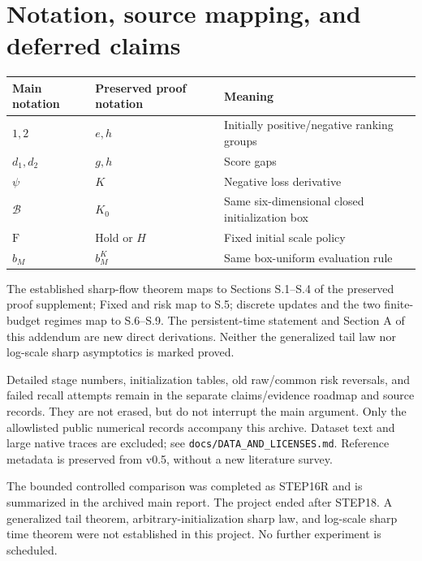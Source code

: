 \documentclass[10pt,a4paper]{article}
\begin{document}
\section{Notation, source mapping, and deferred claims}
\begin{center}\small
\begin{tabularx}{\linewidth}{@{}p{.22\linewidth}p{.24\linewidth}Y@{}}\toprule
Main notation & Preserved proof notation & Meaning\\\midrule
$1,2$ & $e,h$ & Initially positive/negative ranking groups\\
$d_1,d_2$ & $g,h$ & Score gaps\\
$\psi$ & $K$ & Negative loss derivative\\
$\mathcal B$ & $K_0$ & Same six-dimensional closed initialization box\\
$\mathrm F$ & Hold or $H$ & Fixed initial scale policy\\
$b_M$ & $b_M^K$ & Same box-uniform evaluation rule\\\bottomrule
\end{tabularx}
\end{center}
The established sharp-flow theorem maps to Sections S.1--S.4 of the preserved proof supplement; Fixed and risk map to S.5; discrete updates and the two finite-budget regimes map to S.6--S.9. The persistent-time statement and Section A of this addendum are new direct derivations. Neither the generalized tail law nor log-scale sharp asymptotics is marked proved.

Detailed stage numbers, initialization tables, old raw/common risk reversals, and failed recall attempts remain in the separate claims/evidence roadmap and source records. They are not erased, but do not interrupt the main argument. Only the allowlisted public numerical records accompany this archive. Dataset text and large native traces are excluded; see \texttt{docs/DATA\_AND\_LICENSES.md}. Reference metadata is preserved from v0.5, without a new literature survey.

The bounded controlled comparison was completed as STEP16R and is summarized in the archived main report. The project ended after STEP18. A generalized tail theorem, arbitrary-initialization sharp law, and log-scale sharp time theorem were not established in this project. No further experiment is scheduled.
\end{document}
